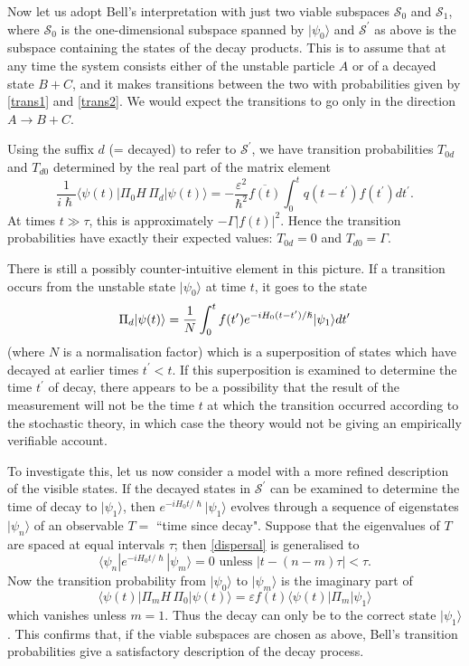 \documentclass[12pt,a4paper,reqno]{article}
\renewcommand{\(}{\left(}
\renewcommand{\)}{\right)}
\renewcommand{\hbar}{\hslash}
\renewcommand{\S}{\mathcal{S}}
\newcommand{\<}{\langle}
\renewcommand{\>}{\rangle}
\theoremstyle{plain} %
\theoremstyle{definition}
\theoremstyle{remark}
\begin{document}
Now let us adopt Bell's interpretation with just two viable subspaces
$\S_0$ and $\S_1$, where $\S_0$ is the one-dimensional subspace 
spanned by $|\psi_0\>$ and $\S^\prime$ as above is the subspace
containing the states of the decay products. This is to assume that at
any time the system consists either of the unstable particle $A$ or of a
decayed state $B+C$, and it makes transitions between the two with
probabilities given by \eqref{trans1} and \eqref{trans2}. We would expect the
transitions to go only in the direction $A\rightarrow B+C$. 

Using the suffix $d$ (= decayed) to refer to $\S^\prime$, we have
transition probabilities $T_{0d}$ and $T_{d0}$ determined by the real
part of the matrix element 
\[
\frac{1}{i\hbar}\<\psi(t)|\Pi_0 H\, \Pi_d|\psi(t)\> =
-\frac{\varepsilon^2}{\hbar^2}\overline{f(t)}\int_0^t
q(t-t^\prime)f(t^\prime)dt^\prime.
\]
At times $t\gg\tau$, this is approximately $-\Gamma|f(t)|^2$. Hence the transition
probabilities have exactly their expected values: $T_{0d}=0$ and
$T_{d0}=\Gamma$.

There is still a possibly counter-intuitive element in this picture. If
a transition occurs from the unstable state $|\psi_0\>$ at time $t$, it
goes to the state 
\[
\Pi_d|\psi(t)\> = {1\over N}\int_0^t
f(t^\prime)e^{-iH_0(t-t^\prime)/\hbar}|\psi_1\>dt^\prime
\]
(where $N$ is a normalisation factor) which is a superposition of states
which have decayed at earlier times $t^\prime < t$. If this
superposition is examined to determine the time $t^\prime$ of decay,
there appears to be a possibility that the result of the measurement
will not be the time $t$ at which the transition occurred according to
the stochastic theory, in which case the theory would not be giving an
empirically verifiable account. 

To investigate this, let us now consider a model with a more refined
description of the visible states. If the decayed states in $\S^\prime$
can be examined to determine the time of decay to $|\psi_1\>$, then
$e^{-iH_0t/\hbar}|\psi_1\>$ evolves through a sequence of eigenstates
$|\psi_n\>$ of an observable $T =$ ``time since decay". Suppose that
the eigenvalues of $T$ are spaced at equal intervals $\tau$; then
\eqref{dispersal} is generalised to 
\begin{equation}
\<\psi_n|e^{-iH_0t/\hbar}|\psi_m\> = 0 \text{  unless  } |t - (n-m)\tau|<\tau. 
\end{equation}
Now the transition probability from $|\psi_0\>$ to $|\psi_m\>$ is the
imaginary part of 
\[ 
\<\psi(t)|\Pi_m H\, \Pi_0|\psi(t)\> = \varepsilon
f(t)\<\psi(t)|\Pi_m|\psi_1\>
\]
which vanishes unless $m=1$. Thus the decay can only be to the correct
state $|\psi_1\>$. This confirms that, if the viable
subspaces are chosen as above, Bell's transition probabilities
give a satisfactory description of the decay process.
\end{document}
